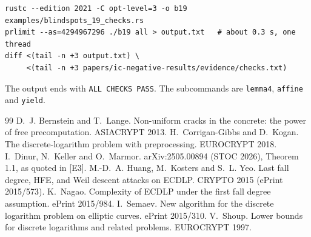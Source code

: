 \documentclass[10pt,a4paper]{article}
\newcommand{\ev}[1]{\textup{[#1]}}
\theoremstyle{definition}
\theoremstyle{remark}
\begin{document}
\begin{verbatim}
rustc --edition 2021 -C opt-level=3 -o b19 examples/blindspots_19_checks.rs
prlimit --as=4294967296 ./b19 all > output.txt   # about 0.3 s, one thread
diff <(tail -n +3 output.txt) \
     <(tail -n +3 papers/ic-negative-results/evidence/checks.txt)
\end{verbatim}
\noindent The output ends with \texttt{ALL CHECKS PASS}. The subcommands are
\texttt{lemma4}, \texttt{affine} and \texttt{yield}.

\begin{thebibliography}{99}
 D.~J. Bernstein and T.~Lange. Non-uniform cracks in the concrete: the
power of free precomputation. ASIACRYPT 2013.
 H.~Corrigan-Gibbs and D.~Kogan. The discrete-logarithm problem with
preprocessing. EUROCRYPT 2018.
 I.~Dinur, N.~Keller and O.~Marmor. arXiv:2505.00894 (STOC 2026),
Theorem 1.1, as quoted in \ev{E3}.
 M.-D.~A. Huang, M.~Kosters and S.~L. Yeo. Last fall degree, HFE, and
Weil descent attacks on ECDLP. CRYPTO 2015 (ePrint 2015/573).
 K.~Nagao. Complexity of ECDLP under the first fall degree assumption.
ePrint 2015/984.
 I.~Semaev. New algorithm for the discrete logarithm problem on
elliptic curves. ePrint 2015/310.
 V.~Shoup. Lower bounds for discrete logarithms and related problems.
EUROCRYPT 1997.
\end{thebibliography}
\end{document}
